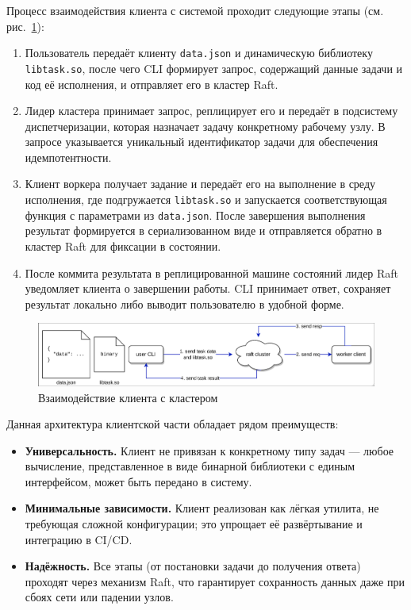 Процесс взаимодействия клиента с системой проходит следующие этапы (см.
рис.~\ref{fig:client-arch}):
\begin{enumerate}
    \item Пользователь передаёт клиенту \texttt{data.json} и
    динамическую библиотеку \texttt{libtask.so}, после чего CLI
    формирует запрос, содержащий данные задачи и код её исполнения,
    и отправляет его в кластер Raft.
    \item Лидер кластера принимает запрос, реплицирует его
    и передаёт в подсистему диспетчеризации, которая назначает
    задачу конкретному рабочему узлу. В запросе указывается
    уникальный идентификатор задачи для обеспечения идемпотентности.
    \item Клиент воркера получает задание и передаёт его на выполнение
    в среду исполнения, где подгружается \texttt{libtask.so} и
    запускается соответствующая функция с параметрами из \texttt{data.json}.
    После завершения выполнения результат формируется в сериализованном
    виде и отправляется обратно в кластер Raft для фиксации в состоянии.
    \item После коммита результата в реплицированной машине состояний
    лидер Raft уведомляет клиента о завершении работы. CLI принимает
    ответ, сохраняет результат локально либо выводит пользователю
    в удобной форме.
\end{enumerate}

\begin{figure}
  \centering
  \includegraphics[scale=0.25]{inc/client-arch.png}
  \caption{Взаимодействие клиента с кластером}
  \label{fig:client-arch}
\end{figure}

Данная архитектура клиентской части обладает рядом преимуществ:
\begin{itemize}
    \item \textbf{Универсальность.} Клиент не привязан к конкретному
    типу задач — любое вычисление, представленное в виде бинарной
    библиотеки с единым интерфейсом, может быть передано в систему.
    \item \textbf{Минимальные зависимости.} Клиент реализован как
    лёгкая утилита, не требующая сложной конфигурации;
    это упрощает её развёртывание и интеграцию в CI/CD.
    \item \textbf{Надёжность.} Все этапы (от постановки задачи до
    получения ответа) проходят через механизм Raft, что гарантирует
    сохранность данных даже при сбоях сети или падении узлов.
\end{itemize}

